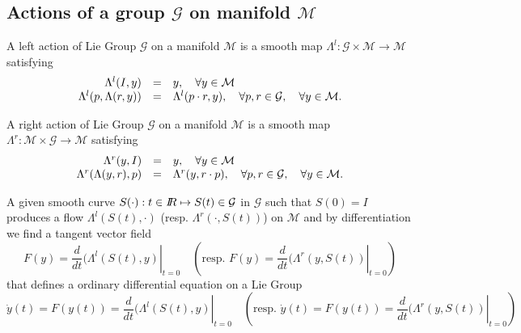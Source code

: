 \subsection{Actions of a group $\mathcal G$ on  manifold $\mathcal M$}
\begin{definition}
   A left  action of Lie Group $\mathcal G$ on a manifold $\mathcal M$ is a smooth map $\Lambda^l: \mathcal G \times  \mathcal M \rightarrow \mathcal M$ satisfying
\begin{equation}
  \label{eq:22}
  \begin{array}[lcl]{rcl}
    \Lambda^l(I,y) &=& y, \quad \forall y \in \mathcal M \\
    \Lambda^l(p,\Lambda(r,y)) &=& \Lambda^l(p\glaw r, y) , \quad \forall p,r \in \mathcal G,\quad  \forall y \in \mathcal M .
  \end{array}
\end{equation}
\end{definition}

\begin{definition}
   A  right  action of Lie Group $\mathcal G$ on a manifold $\mathcal M$ is a smooth map $\Lambda^r: \mathcal M \times \mathcal G   \rightarrow \mathcal M$ satisfying
\begin{equation}
  \label{eq:23}
  \begin{array}[lcl]{rcl}
    \Lambda^r(y,I) &=& y, \quad \forall y \in \mathcal M \\
    \Lambda^r(\Lambda(y,r), p) &=& \Lambda^r(y,  r\glaw p) , \quad \forall p,r \in \mathcal G,\quad  \forall y \in \mathcal M .
  \end{array}
\end{equation}
\end{definition}

A given smooth curve  $S(\cdot) : t\in \mbox{\rm $I\!\!R$} \mapsto S(t)\in \mathcal G$ in $\mathcal G$ such that $S(0)= I$ produces a flow $\Lambda^l(S(t),\cdot)$ (resp. $\Lambda^r(\cdot, S(t))$) on $\mathcal M$ and by differentiation we find a tangent vector field
\begin{equation}
  \label{eq:24}
  F(y) = \left. \frac{d}{dt} (\Lambda^l(S(t),y) \right|_{t=0}\quad( \text{resp.  }  F(y) = \left. \frac{d}{dt} (\Lambda^r(y,S(t)) \right|_{t=0} )
\end{equation}
that defines a ordinary differential equation on a Lie Group
\begin{equation}
  \label{eq:25}
  \dot y(t) = F(y(t)) = \left. \frac{d}{dt} (\Lambda^l(S(t),y) \right|_{t=0}  \quad( \text{resp.  }\dot y(t) = F(y(t)) = \left. \frac{d}{dt} (\Lambda^r(y,S(t)) \right|_{t=0})
\end{equation}


